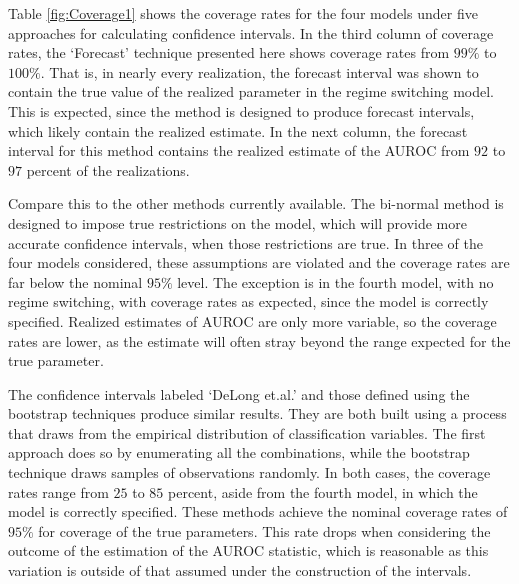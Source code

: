 




%
%
%
%

Table \ref{fig:Coverage1} shows the coverage rates for the four models under five approaches for calculating confidence intervals.
In the third column of coverage rates, the `Forecast' technique presented here shows coverage rates from $99\%$ to $100\%$.
That is, in nearly every realization, the forecast interval was shown to contain the true value of the realized parameter in the regime switching model.
This is expected, since the method is designed to produce forecast intervals, which likely contain the realized estimate.
In the next column, the forecast interval for this method contains the realized estimate of the AUROC from $92$ to $97$ percent of the realizations.

Compare this to the other methods currently available.
The bi-normal method is designed to impose true restrictions on the model, which will provide more accurate confidence intervals, when those restrictions are true.
In three of the four models considered, these assumptions are violated and the coverage rates are far below the nominal $95\%$ level.
The exception is in the fourth model, with no regime switching, with coverage rates as expected, since the model is correctly specified.
Realized estimates of AUROC are only more variable, so the coverage rates are lower, as the estimate will often stray beyond the range expected for the true parameter.

The confidence intervals labeled `DeLong et.al.' and those defined using the bootstrap techniques produce similar results.
They are both built using a process that draws from the empirical distribution of classification variables.
The first approach does so by enumerating all the combinations, while the bootstrap technique draws samples of observations randomly.
In both cases, the coverage rates range from $25$ to $85$ percent, aside from the fourth model, in which the model is correctly specified.
These methods achieve the nominal coverage rates of $95\%$ for coverage of the true parameters.
This rate drops when considering the outcome of the estimation of the AUROC statistic, which is reasonable as this variation is outside of that assumed under the construction of the intervals.






% 


